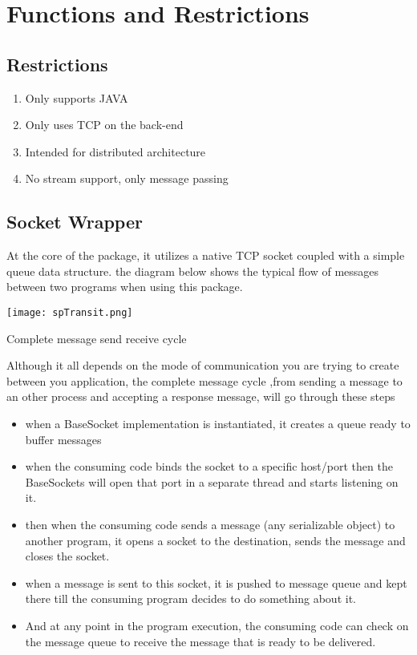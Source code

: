 \documentclass[twoside]{article}
\begin{document}
\section{Functions and Restrictions}

\subsection{Restrictions}

\begin{enumerate}
\item Only supports JAVA
\item Only uses TCP on the back-end
\item Intended for distributed architecture
\item No stream support, only message passing
\end{enumerate}

\subsection{Socket Wrapper}

At the core of the package, it utilizes a native TCP socket coupled with a simple queue data structure. the diagram below shows the typical flow of messages between two programs when using this package.

\begin{center}
    \texttt{[image: spTransit.png]}
    
     {Complete message send receive cycle}
\end{center}

Although it all depends on the mode of communication you are trying to create between you application, the complete message cycle ,from sending a message to an other process and accepting a response message, will go through these steps

\begin{itemize}

\item when a BaseSocket implementation is instantiated, it creates a queue ready to buffer messages

\item when the consuming code binds the socket to a specific host/port then the BaseSockets will open that port in a separate thread and starts listening on it.


\item then when the consuming code sends a message (any serializable object) to another program, it opens a socket to the destination, sends the message and closes the socket.

\item when a message is sent to this socket, it is pushed to message queue and kept there till the consuming program decides to do something about it.

\item And at any point in the program execution, the consuming code can check on the message queue to receive the message that is ready to be delivered.
\end{itemize}
\end{document}

